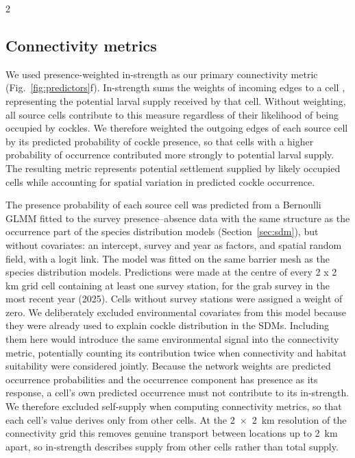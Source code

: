 \begin{spacing}{2}
\subsection{Connectivity metrics}
    
We used presence-weighted in-strength as our primary connectivity metric (Fig.~\ref{fig:predictors}f). In-strength sums the weights of incoming edges to a cell \citep{squartiniReciprocityWeightedNetworks2013}, representing the potential larval supply received by that cell. Without weighting, all source cells contribute to this measure regardless of their likelihood of being occupied by cockles. We therefore weighted the outgoing edges of each source cell by its predicted probability of cockle presence, so that cells with a higher probability of occurrence contributed more strongly to potential larval supply. The resulting metric represents potential settlement supplied by likely occupied cells while accounting for spatial variation in predicted cockle occurrence.

The presence probability of each source cell was predicted from a Bernoulli GLMM fitted to the survey presence--absence data with the same structure as the occurrence part of the species distribution models (Section~\ref{sec:sdm}), but without covariates: an intercept, survey and year as factors, and spatial random field, with a logit link. The model was fitted on the same barrier mesh as the species distribution models. Predictions were made at the centre of every 2 x 2 km grid cell containing at least one survey station, for the grab survey in the most recent year (2025).
Cells without survey stations were assigned a weight of zero. We deliberately excluded environmental covariates from this model because they were already used to explain cockle distribution in the SDMs. Including them here would introduce the same environmental signal into the connectivity metric, potentially counting its contribution twice when connectivity and habitat suitability were considered jointly. Because the network weights are predicted occurrence probabilities and the occurrence component has presence as its response, a cell's own predicted occurrence must not contribute to its in-strength. We therefore excluded self-supply when computing connectivity metrics, so that each cell's value derives only from other cells. At the 2~$\times$~2~km resolution of the connectivity grid this removes genuine transport between locations up to 2~km apart, so in-strength describes supply from other cells rather than total supply.


\end{spacing}
